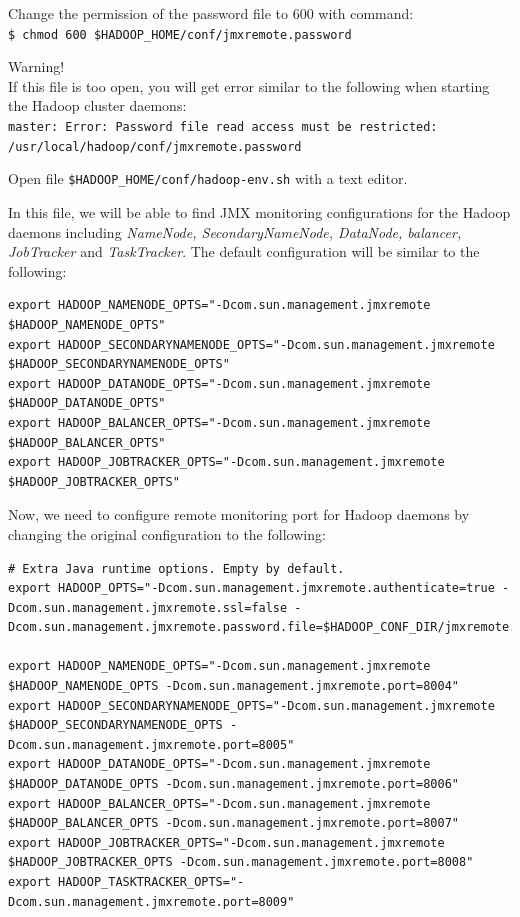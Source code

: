Change the permission of the password file to 600 with command: \\
\verb|$ chmod 600 $HADOOP_HOME/conf/jmxremote.password|

\begin{warning}
Warning! \\
If this file is too open, you will get error similar to the following when starting the Hadoop cluster daemons: \\
\verb|master: Error: Password file read access must be restricted: /usr/local/hadoop/conf/jmxremote.password|
\end{warning}

Open file \verb|$HADOOP_HOME/conf/hadoop-env.sh| with a text editor.

In this file, we will be able to find JMX monitoring configurations for the Hadoop daemons including \emph{NameNode, SecondaryNameNode, DataNode, balancer, JobTracker} and \emph{TaskTracker}. The default configuration will be similar to the following:
\begin{verbatim}
export HADOOP_NAMENODE_OPTS="-Dcom.sun.management.jmxremote $HADOOP_NAMENODE_OPTS"
export HADOOP_SECONDARYNAMENODE_OPTS="-Dcom.sun.management.jmxremote $HADOOP_SECONDARYNAMENODE_OPTS"
export HADOOP_DATANODE_OPTS="-Dcom.sun.management.jmxremote $HADOOP_DATANODE_OPTS"
export HADOOP_BALANCER_OPTS="-Dcom.sun.management.jmxremote $HADOOP_BALANCER_OPTS"
export HADOOP_JOBTRACKER_OPTS="-Dcom.sun.management.jmxremote $HADOOP_JOBTRACKER_OPTS"
\end{verbatim}

Now, we need to configure remote monitoring port for Hadoop daemons by changing the original configuration to the following: 
\begin{verbatim}
# Extra Java runtime options. Empty by default.
export HADOOP_OPTS="-Dcom.sun.management.jmxremote.authenticate=true -Dcom.sun.management.jmxremote.ssl=false -Dcom.sun.management.jmxremote.password.file=$HADOOP_CONF_DIR/jmxremote.password"

export HADOOP_NAMENODE_OPTS="-Dcom.sun.management.jmxremote $HADOOP_NAMENODE_OPTS -Dcom.sun.management.jmxremote.port=8004"
export HADOOP_SECONDARYNAMENODE_OPTS="-Dcom.sun.management.jmxremote $HADOOP_SECONDARYNAMENODE_OPTS -Dcom.sun.management.jmxremote.port=8005"
export HADOOP_DATANODE_OPTS="-Dcom.sun.management.jmxremote $HADOOP_DATANODE_OPTS -Dcom.sun.management.jmxremote.port=8006"
export HADOOP_BALANCER_OPTS="-Dcom.sun.management.jmxremote $HADOOP_BALANCER_OPTS -Dcom.sun.management.jmxremote.port=8007"
export HADOOP_JOBTRACKER_OPTS="-Dcom.sun.management.jmxremote $HADOOP_JOBTRACKER_OPTS -Dcom.sun.management.jmxremote.port=8008"
export HADOOP_TASKTRACKER_OPTS="-Dcom.sun.management.jmxremote.port=8009"
\end{verbatim}


